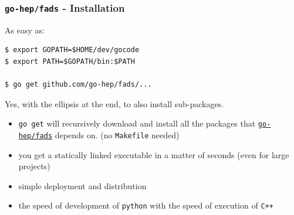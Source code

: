 \documentclass[9pt]{beamer}
\newcommand{\mypurple}[1]{{\color[rgb]{0.7,0,0.8}#1}}
\newcommand{\myred}  [1] {{\color{red}#1}}
\newcommand{\myblue} [1] {{\color{blue}#1}}
\begin{document}
\begin{frame}[fragile]
  \frametitle{\texttt{go-hep/fads} - Installation}

  \begin{block}{}
    As easy as:
\begin{verbatim}
$ export GOPATH=$HOME/dev/gocode
$ export PATH=$GOPATH/bin:$PATH

$ go get github.com/go-hep/fads/...
\end{verbatim}

    
  Yes, with the ellipsis at the end, to also install sub-packages.
  \end{block}

  \begin{block}{}
    \begin{itemize}
      \item \texttt{go get} will recursively download and install all
        the packages that
        \myblue{\href{https://github.com/go-hep/fads}{\texttt{go-hep/fads}}}
        depends on. (no \texttt{Makefile} needed)

      \item you get a \myred{statically linked} executable in a matter
        of seconds (even for large projects)
      \item \myred{simple} deployment and distribution
      \item the \mypurple{speed} of development of \texttt{python}
        with the \mypurple{speed} of execution of \texttt{C++}
    \end{itemize}
  \end{block}
\end{frame}
\end{document}
